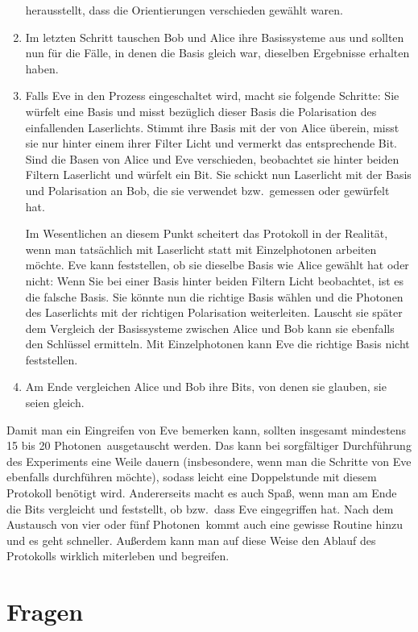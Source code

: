 \begin{enumerate}
herausstellt, dass die Orientierungen verschieden gew\"ahlt waren. 
\item
Im letzten Schritt tauschen Bob und Alice ihre Basissysteme aus und sollten nun f\"ur die
F\"alle, in denen die Basis gleich war, dieselben Ergebnisse erhalten haben.
\item
Falls Eve in den Prozess eingeschaltet wird, macht sie folgende Schritte: Sie w\"urfelt eine Basis
und misst bez\"uglich dieser Basis die Polarisation des einfallenden Laserlichts. Stimmt ihre Basis
mit der von Alice \"uberein, misst sie nur hinter einem ihrer Filter Licht und vermerkt das entsprechende
Bit. Sind die Basen von Alice und Eve verschieden, beobachtet sie hinter beiden Filtern Laserlicht
und w\"urfelt ein Bit. Sie schickt nun Laserlicht
mit der Basis und Polarisation an Bob, die sie verwendet bzw.\ gemessen oder gew\"urfelt hat. 

Im Wesentlichen an diesem Punkt scheitert das Protokoll in der Realit\"at, wenn man tats\"achlich
mit Laserlicht statt mit Einzelphotonen arbeiten m\"ochte. Eve kann feststellen, ob sie dieselbe Basis
wie Alice gew\"ahlt hat oder nicht: Wenn Sie bei einer Basis hinter beiden Filtern Licht beobachtet, 
ist es die falsche Basis. Sie k\"onnte nun die richtige Basis w\"ahlen und die Photonen des Laserlichts mit der
richtigen Polarisation weiterleiten. Lauscht sie sp\"ater dem Vergleich der Basissysteme zwischen Alice und
Bob kann sie ebenfalls den Schl\"ussel ermitteln. Mit Einzelphotonen kann Eve die
richtige Basis nicht feststellen.
\item
Am Ende vergleichen Alice und Bob ihre Bits, von denen sie glauben, sie seien gleich.    
\end{enumerate}
Damit man ein Eingreifen von Eve bemerken kann, sollten insgesamt mindestens 15 bis 20 \glqq Photonen\grqq\
ausgetauscht werden. Das kann bei sorgf\"altiger Durchf\"uhrung des Experiments eine Weile dauern
(insbesondere, wenn man die Schritte von Eve ebenfalls durchf\"uhren m\"ochte), sodass leicht eine
Doppelstunde mit diesem Protokoll ben\"otigt wird. Andererseits macht es auch Spa\ss, wenn man
am Ende die Bits vergleicht und feststellt, ob bzw.\ dass Eve eingegriffen hat. Nach dem Austausch
von vier oder f\"unf \glqq Photonen\grqq\ kommt auch eine gewisse Routine hinzu und es geht schneller.
Au\ss erdem kann man auf diese Weise den Ablauf des Protokolls wirklich miterleben und begreifen.

\section{Fragen}

